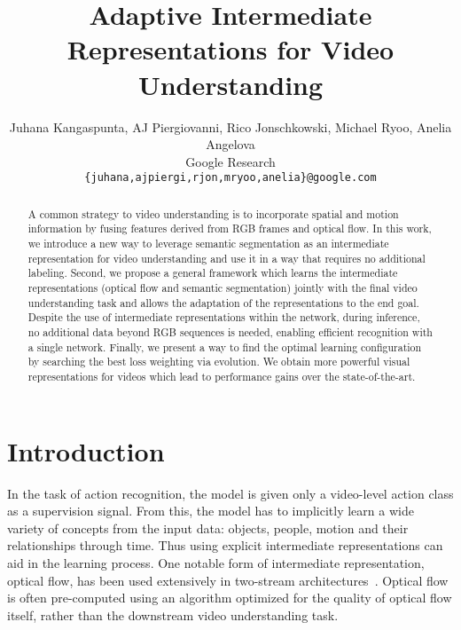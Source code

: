 \documentclass[final]{cvpr}
\begin{document}
\title{Adaptive Intermediate Representations for Video Understanding}




\author{
Juhana Kangaspunta, AJ Piergiovanni, Rico Jonschkowski, Michael Ryoo, Anelia Angelova\\
Google Research\\
{\tt\small \{juhana,ajpiergi,rjon,mryoo,anelia\}@google.com}
}

\maketitle


\begin{abstract}

   A common strategy to video understanding is to incorporate spatial and motion information by fusing features derived from RGB frames and optical flow. In this work, we introduce a new way to leverage semantic segmentation as an intermediate representation for video understanding and use it in a way that requires no additional labeling.                                                       
    Second, we propose a general framework which learns the intermediate representations (optical flow and semantic segmentation) jointly with the final video understanding task and allows the adaptation of the representations to the end goal. Despite the use of intermediate representations within the network, during inference, no additional data beyond RGB sequences is needed, enabling efficient recognition with a single network.           
    Finally, we present a way to find the optimal learning configuration by searching the best loss weighting via evolution.                                   
    We obtain more powerful visual representations for videos which lead to performance gains over the state-of-the-art.         

\end{abstract}


\section{Introduction}






In the task of action recognition, the model is given only a video-level action class as a supervision signal. From this, the model has to implicitly learn a wide variety of concepts from the input data: objects, people, motion and their relationships through time. Thus using explicit intermediate representations can aid in the learning process. One notable form of intermediate representation, optical flow, has been used extensively in two-stream architectures~\cite{simonyan2014two,carreira2017quo,feichtenhofer2016convolutional}. Optical flow is often pre-computed using an algorithm optimized for the quality of optical flow itself, rather than the downstream video understanding task.
\end{document}
